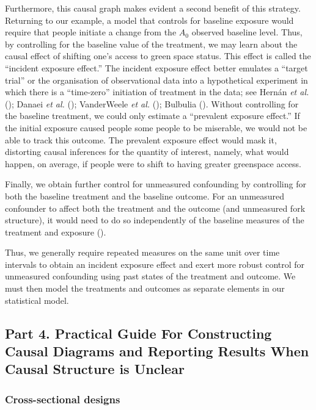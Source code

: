 \documentclass[
  singlecolumn]{article}
\begin{document}
Furthermore, this causal graph makes evident a second benefit of this
strategy. Returning to our example, a model that controls for baseline
exposure would require that people initiate a change from the \(A_0\)
observed baseline level. Thus, by controlling for the baseline value of
the treatment, we may learn about the causal effect of shifting one's
access to green space status. This effect is called the ``incident
exposure effect.'' The incident exposure effect better emulates a
``target trial'' or the organisation of observational data into a
hypothetical experiment in which there is a ``time-zero'' initiation of
treatment in the data; see Hernán \emph{et al.}
(); Danaei \emph{et al.}
(); VanderWeele \emph{et al.}
(); Bulbulia
(). Without controlling for the
baseline treatment, we could only estimate a ``prevalent exposure
effect.'' If the initial exposure caused people some people to be
miserable, we would not be able to track this outcome. The prevalent
exposure effect would mask it, distorting causal inferences for the
quantity of interest, namely, what would happen, on average, if people
were to shift to having greater greenspace access.

Finally, we obtain further control for unmeasured confounding by
controlling for both the baseline treatment and the baseline outcome.
For an unmeasured confounder to affect both the treatment and the
outcome (and unmeasured fork structure), it would need to do so
independently of the baseline measures of the treatment and exposure
().

Thus, we generally require repeated measures on the same unit over time
intervals to obtain an incident exposure effect and exert more robust
control for unmeasured confounding using past states of the treatment
and outcome. We must then model the treatments and outcomes as separate
elements in our statistical model.

\subsection{Part 4. Practical Guide For Constructing Causal Diagrams and
Reporting Results When Causal Structure is Unclear}\label{section-part4}

\subsubsection{Cross-sectional designs}\label{cross-sectional-designs}
\end{document}
